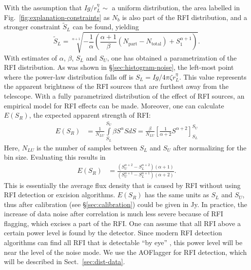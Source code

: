 \documentclass[useAMS,usenatbib]{mn2e}
\begin{document}
With the assumption that $Ig/r_L^\eta\sim$ a uniform distribution, the area labelled in Fig.~\ref{fig:explanation-constraints} as $N_b$ is also part of the RFI distribution, and a stronger constraint $\tilde S_L$ can be found, yielding
\begin{equation} \label{eq:lower-limit-2}
\tilde S_L = \sqrt[\alpha+1]{ - \frac{1}{\alpha} \left( \frac{\alpha+1}{\beta} \left(N_\textrm{part} - N_\textrm{total}\right) + S_1^{\alpha+1} \right) }.
\end{equation}
With estimates of $\alpha$, $\beta$, $S_L$ and $S_U$, one has obtained a parametrization of the RFI distribution. As was shown in \S\ref{sec:histogram-noise}, the left-most point where the power-law distribution falls off is $S_L = Ig / 4\pi \zeta r_L^\eta$. This value represents the apparent brightness of the RFI sources that are furthest away from the telescope. With a fully parametrized distribution of the effect of RFI sources, an empirical model for RFI effects can be made. Moreover, one can calculate $E(S_R)$, the expected apparent strength of RFI:
\begin{align} \label{eq:expected-value-rfi-def}
E(S_R) & = \frac{1}{N_{LU}}\int\limits_{S_L}^{S_U} \beta S^\alpha S dS
 = \frac{\beta}{N_{LU}} \left[ \frac{1}{\alpha+2} S^{\alpha+2} \right]_{S_L}^{S_U}
\end{align}
Here, $N_{LU}$ is the number of samples between $S_L$ and $S_U$ after normalizing for the bin size. Evaluating this results in
\begin{align} \label{eq:expected-value-rfi}
 E(S_R) & = \frac
{\left( S_U^{\alpha+2} - S_L^{\alpha+2}\right)\left(\alpha+1\right)} 
{\left(S_U^{\alpha+1} - S_L^{\alpha+1}\right) \left(\alpha+2 \right)}.
\end{align}
This is essentially the average flux density that is caused by RFI without using RFI detection or excision algorithms. $E(S_R)$ has the same units as $S_L$ and $S_U$, thus after calibration (see \S\ref{sec:calibration}) could be given in Jy. In practice, the increase of data noise after correlation is much less severe because of RFI flagging, which excises a part of the RFI. One can assume that all RFI above a certain power level is found by the detector. Since modern RFI detection algorithms can find all RFI that is detectable ``by eye'' \citep{post-correlation-rfi-classification}, this power level will be near the level of the noise mode. We use the AOFlagger for RFI detection, which will be described in Sect.~\ref{sec:dist-data}.
\end{document}
